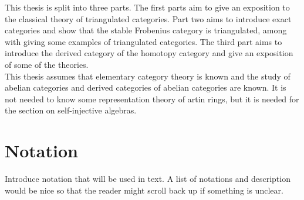     This thesis is split into three parts. The first parts aim to give an exposition to the classical theory of triangulated categories. Part two aims to introduce exact categories and show that the stable Frobenius category is triangulated, among with giving some examples of triangulated categories. The third part aims to introduce the derived category of the homotopy category and give an exposition of some of the theories. \\

    This thesis assumes that elementary category theory is known and the study of abelian categories and derived categories of abelian categories are known. It is not needed to know some representation theory of artin rings, but it is needed for the section on self-injective algebras.
        
    \section*{Notation}
        Introduce notation that will be used in text. A list of notations and description would be nice so that the reader might scroll back up if something is unclear.

